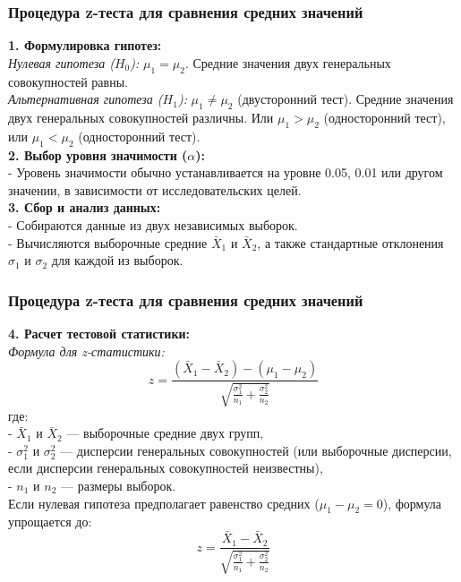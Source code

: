 \documentclass[aspectratio=169]{beamer}
\begin{document}
\begin{frame}
\frametitle{Процедура z-теста для сравнения средних значений}
{\bf 1. Формулировка гипотез:}\\
{\it Нулевая гипотеза ($H_0$):} \( \mu_1 = \mu_2 \).  Средние значения двух генеральных совокупностей равны.\\
{\it Альтернативная гипотеза ($H_1$):} \( \mu_1 \ne \mu_2 \) (двусторонний тест). Средние значения двух генеральных совокупностей различны. Или \( \mu_1 > \mu_2 \) (односторонний тест), или \( \mu_1 < \mu_2 \) (односторонний тест).\\
{\bf 2. Выбор уровня значимости ($\alpha$):}\\
- Уровень значимости обычно устанавливается на уровне 0.05, 0.01 или другом значении, в зависимости от исследовательских целей.\\
{\bf 3. Сбор и анализ данных:}\\
- Собираются данные из двух независимых выборок.\\
- Вычисляются выборочные средние \( \bar{X}_1 \) и \( \bar{X}_2 \), а также стандартные отклонения \( \sigma_1 \) и \( \sigma_2 \) для каждой из выборок.
\end{frame}

\begin{frame}
\frametitle{Процедура z-теста для сравнения средних значений}
{\bf 4. Расчет тестовой статистики:}\\
{\it Формула для z-статистики:}
  \[
  z = \frac{(\bar{X}_1 - \bar{X}_2) - (\mu_1 - \mu_2)}{\sqrt{\frac{\sigma_1^2}{n_1} + \frac{\sigma_2^2}{n_2}}}
  \]
где:\\
- \( \bar{X}_1 \) и \( \bar{X}_2 \) — выборочные средние двух групп,\\
- \( \sigma_1^2 \) и \( \sigma_2^2 \) — дисперсии генеральных совокупностей (или выборочные дисперсии, если дисперсии генеральных совокупностей неизвестны),\\
- \( n_1 \) и \( n_2 \) — размеры выборок.\\
Если нулевая гипотеза предполагает равенство средних (\( \mu_1 - \mu_2 = 0 \)), формула упрощается до:
  \[
  z = \frac{\bar{X}_1 - \bar{X}_2}{\sqrt{\frac{\sigma_1^2}{n_1} + \frac{\sigma_2^2}{n_2}}}
  \]
\end{frame}
\end{document}
